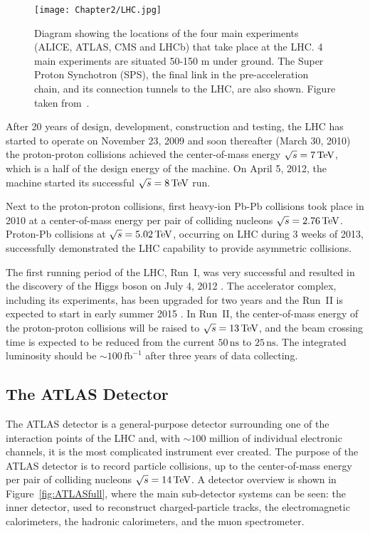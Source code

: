\begin{figure}[t]
  \centering
  \texttt{[image: Chapter2/LHC.jpg]}
  \caption{Diagram showing the locations of the four main experiments (ALICE,
          ATLAS, CMS and LHCb) that take place at the LHC. 4 main experiments
          are situated 50-150 m under ground.
          The Super Proton Synchotron (SPS), the final link in the
          pre-acceleration chain, and its connection tunnels to the LHC, are also
          shown.  Figure taken from~\cite{CERN:ATLASexperimentPictureswiki}.  }
  \label{fig:LHC}
\end{figure}

After 20 years of design, development, construction and testing, the LHC has
started to operate on November 23, 2009 and soon thereafter (March 30, 2010) the
proton-proton collisions achieved the center-of-mass energy $\sqrt{s} = 7 \,\text{TeV}$,
which is a half of the design energy of the machine. On April 5, 2012, the
machine started its successful $\sqrt{s} = 8 \,\text{TeV}$ run.

Next to the proton-proton collisions, first heavy-ion Pb-Pb collisions took place
in 2010 at a center-of-mass energy per pair of colliding nucleons $\sqrt{s} =
2.76 \,\text{TeV}$. Proton-Pb collisions at $\sqrt{s} = 5.02 \,\text{TeV}$, occurring on LHC
during 3 weeks of 2013, successfully demonstrated the LHC capability to provide
asymmetric collisions.  

The first running period of the LHC, Run~I, was very successful and resulted in
the discovery of the Higgs boson on July 4, 2012 \cite{HiggsDiscovery}.  The
accelerator complex, including its experiments, has been upgraded for two years
and the Run~II is expected to start in early summer 2015 \cite{LHCFuture,
LHCFutureLuminosigy}. In Run~II, the center-of-mass energy of the proton-proton
collisions will be raised to $\sqrt{s} = 13 \,\text{TeV}$, and the beam crossing time
is expected to be reduced from the current $50\,\text{ns}$ to $25\,\text{ns}$. The
integrated luminosity should be $\sim 100\,\text{fb}^{-1}$ after three years of
data collecting.

\subsection{The ATLAS Detector}

The ATLAS detector \cite{ATLAS} is a general-purpose detector surrounding one of
the interaction points of the LHC and, with $\sim 100$ million of individual
electronic channels, it is the most complicated instrument ever created.
The purpose of the ATLAS detector is to record particle collisions, up to the center-of-mass
energy per pair of colliding nucleons $\sqrt{s} = 14 \,\text{TeV}$. A detector overview is
shown in Figure~\ref{fig:ATLASfull}, where the main sub-detector systems can be
seen: the inner detector, used to reconstruct charged-particle tracks, the
electromagnetic calorimeters, the hadronic calorimeters, and the muon
spectrometer. 

